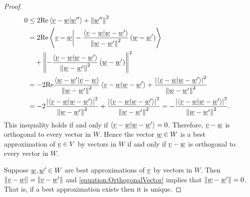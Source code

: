 \begin{proof}
\begin{equation}
\begin{split}
0 &\leq
2 \mathrm{Re} \left\langle \underline{v} - \underline{w} | \underline{w}'' \right\rangle
+ \left\| \underline{w}'' \right\|^2 \\
&= 2 \mathrm{Re} \left\langle \underline{v} - \underline{w} \bigg| - \frac{ \left\langle \underline{v} - \underline{w} | \underline{w} - \underline{w}' \right\rangle }{ \left\| \underline{w} - \underline{w}' \right\|^2 } \left( \underline{w} - \underline{w}' \right) \right\rangle \\
&\quad + \left\| - \frac{ \left\langle \underline{v} - \underline{w} | \underline{w} - \underline{w}' \right\rangle }{ \left\| \underline{w} - \underline{w}' \right\|^2 } \left( \underline{w} - \underline{w}' \right) \right\|^2 \\
&= - 2 \mathrm{Re} \frac{ \left\langle \underline{w} - \underline{w}' | \underline{v} - \underline{w} \right\rangle }{ \left\| \underline{w} - \underline{w}' \right\|^2 }
\left\langle \underline{v} - \underline{w} | \underline{w} - \underline{w}' \right\rangle
+ \frac{\left| \left\langle \underline{v} - \underline{w} | \underline{w} - \underline{w}' \right\rangle \right|^2}{ \left\| \underline{w} - \underline{w}' \right\|^2 } \\
&= - 2 \frac{ \left| \left\langle \underline{v} - \underline{w} | \underline{w} - \underline{w}' \right\rangle \right|^2 }{ \left\| \underline{w} - \underline{w}' \right\|^2 }
+ \frac{ \left| \left\langle \underline{v} - \underline{w} | \underline{w} - \underline{w}' \right\rangle \right|^2 }{ \left\| \underline{w} - \underline{w}' \right\|^2 }
= - \frac{ \left| \left\langle \underline{v} - \underline{w} | \underline{w} - \underline{w}' \right\rangle \right|^2 }{ \left\| \underline{w} - \underline{w}' \right\|^2 } .
\end{split}
\end{equation}
This inequality holds if and only if $\left\langle \underline{v} - \underline{w} | \underline{w} - \underline{w}' \right\rangle = 0$.
Therefore, $\underline{v} - \underline{w}$ is orthogonal to every vector in $W$.
Hence the vector $\underline{w} \in W$ is a best approximation of $\underline{v} \in V$ by vectors in $W$ if and only if $\underline{v} - \underline{w}$ is orthogonal to every vector in $W$.

Suppose $\underline{w}, \underline{w}' \in W$ are best approximations of $\underline{v}$ by vectors in $W$.
Then $\left\| \underline{v} - \underline{w} \right\| = \left\| \underline{v} - \underline{w}' \right\|$ and \eqref{equation:OrthogonalVector} implies that $\left\| \underline{w} - \underline{w}' \right\| = 0$.
That is, if a best approximation exists then it is unique.


\end{proof}
